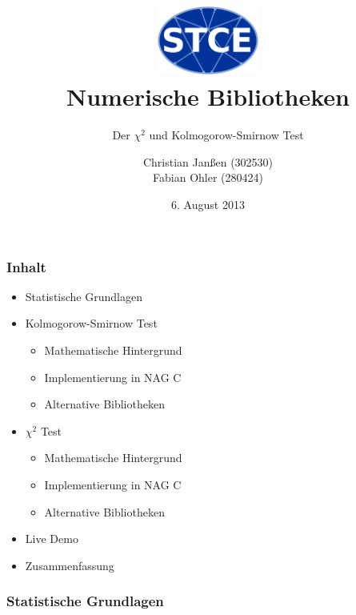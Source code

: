 \documentclass{beamer}
\begin{document}
\title{\centering
\includegraphics[width=0.25\textwidth]{./figures/logo.eps} \\ Numerische Bibliotheken}

\subtitle{Der $\chi^2$ und Kolmogorow-Smirnow Test}
\author{Christian Janßen (302530) \\ Fabian Ohler (280424) }
\date{6. August 2013}
\frame[plain]{\titlepage}

\begin{frame}
\frametitle{Inhalt}
	\begin{itemize}
		\item Statistische Grundlagen
		\item Kolmogorow-Smirnow Test
		\begin{itemize}
			\item Mathematische Hintergrund
			\item Implementierung in NAG C
			\item Alternative Bibliotheken
		\end{itemize}
		\item $\chi^2$ Test
		\begin{itemize}
			\item Mathematische Hintergrund
			\item Implementierung in NAG C
			\item Alternative Bibliotheken
		\end{itemize}
		\item Live Demo
		\item Zusammenfassung
	\end{itemize}
\end{frame}

\begin{frame}
\frametitle{Statistische Grundlagen}
\end{frame}
\end{document}
